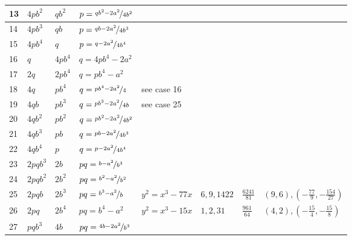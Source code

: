 \documentclass[12pt]{amsart}
\theoremstyle{definition}
\begin{document}
{\begin{table}[H]
\begin{tabular}{|l|l|l|l|l|l|l|l|}
				\\
				\hline
				13 &
				$4pb^2$ &
				$qb^2$ &
				$p=\nicefrac{qb^2-2a^2}{4b^2}$ &
				&
				&
				&
				
				\\
				\hline
				14 &
				$4pb^3$ &
				$qb$ &
				$p=\nicefrac{qb-2a^2}{4b^3}$ &
				&
				&
				&
				
				\\
				\hline
				15 &
				$4pb^4$ &
				$q$ &
				$p=\nicefrac{q-2a^2}{4b^4}$ &
				&
				&
				&
				
				\\
				\hline
				16 &
				$q$ &
				$4pb^4$ &
				$q=4pb^4-2a^2$ &
				&
				&
				&
				
				\\
				\hline
				17 &
				$2q$ &
				$2pb^4$ &
				$q=pb^4-a^2$ &
				&
				&
				&
				
				\\
				\hline
				18 &
				$4q$ &
				$pb^4$ &
				$q=\nicefrac{pb^4-2a^2}{4}$ &
				see case 16 &
				&
				&
				
				\\
				\hline
				19 &
				$4qb$ &
				$pb^3$ &
				$q=\nicefrac{pb^3-2a^2}{4b}$ &
				see case 25 &
				&
				&
				
				\\
				\hline
				20 &
				$4qb^2$ &
				$pb^2$ &
				$q=\nicefrac{pb^2-2a^2}{4b^2}$ &
				&
				&
				&
				
				\\
				\hline
				21 &
				$4qb^3$ &
				$pb$ &
				$q=\nicefrac{pb-2a^2}{4b^3}$ &
				&
				&
				&
				
				\\
				\hline
				22 &
				$4qb^4$ &
				$p$ &
				$q=\nicefrac{p-2a^2}{4b^4}$ &
				&
				&
				&
				
				\\
				\hline
				23 &
				$2pqb^3$ &
				$2b$ &
				$pq=\nicefrac{b-a^2}{b^3}$ &
				&
				&
				&
				
				\\
				\hline
				24 &
				$2pqb^2$ &
				$2b^2$ &
				$pq=\nicefrac{b^2-a^2}{b^2}$ &
				&
				&
				&
				
				\\
				\hline
				25 &
				$2pqb$ &
				$2b^3$ &
				$pq=\nicefrac{b^3-a^2}{b}$ &
				$y^2=x^3-77x$ &
				$6,9,1422$ &
				$\frac{6241}{81}$ &
				$(9,6),(-\frac{77}{9},-\frac{154}{27})$
				\\
				\hline
				26 &
				$2pq$ &
				$2b^4$ &
				$pq=b^4-a^2$ &
				$y^2=x^3-15x$ &
				$1,2,31$&
				$\frac{961}{64}$ &
				$(4,2),(-\frac{15}{4},-\frac{15}{8})$
				\\
				\hline
				27 &
				$pqb^3$ &
				$4b$ &
				$pq=\nicefrac{4b-2a^2}{b^3}$ &
				&
				&
				&
				

\end{tabular}
\end{table}}
\end{document}
